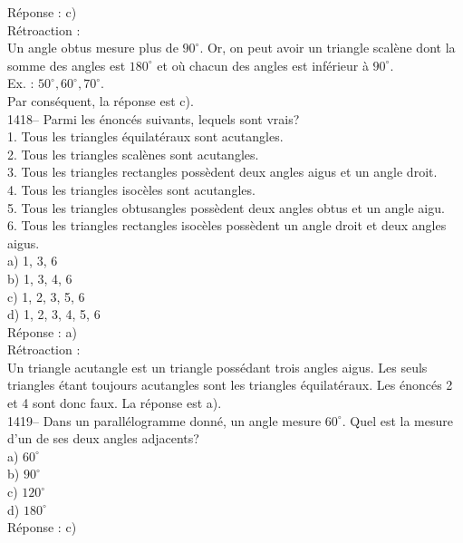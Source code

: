 R\'eponse : c)\\

R\'etroaction :\\
Un angle obtus mesure plus de $90^\circ$. Or, on peut avoir un
triangle scal\`ene dont la somme des angles est $180^\circ$ et o\`u
chacun des angles est inf\'erieur \`a
$90^\circ$.\\
Ex. : $50^\circ, 60^\circ, 70^\circ.$\\
Par cons\'equent, la r\'eponse est c).\\

1418-- Parmi les \'enonc\'es suivants, lequels sont vrais?\\

1. Tous les triangles \'equilat\'eraux sont acutangles.\\
2. Tous les triangles scal\`enes sont acutangles.\\
3. Tous les triangles rectangles poss\`edent deux angles aigus et un angle
droit.\\
4. Tous les triangles isoc\`eles sont acutangles. \\
5. Tous les triangles obtusangles poss\`edent deux angles obtus et un angle
aigu.\\
6. Tous les triangles rectangles isoc\`eles poss\`edent un angle droit et
deux angles aigus.\\

a) 1, 3, 6\\
b) 1, 3, 4, 6\\
c) 1, 2, 3, 5, 6\\
d) 1, 2, 3, 4, 5, 6\\

R\'eponse : a)\\

R\'etroaction :\\
Un triangle acutangle est un triangle poss\'edant trois angles
aigus. Les seuls triangles \'etant toujours acutangles sont les
triangles \'equilat\'eraux. Les \'enonc\'es 2 et 4 sont donc faux.
La r\'eponse est a).\\

1419-- Dans un parall\'elogramme donn\'e, un angle mesure $60^\circ$.
Quel est la
mesure d'un de ses deux angles adjacents?\\
a) $60^\circ$\\
b) $90^\circ$\\
c) $120^\circ$\\
d) $180^\circ$\\

R\'eponse : c)\\

